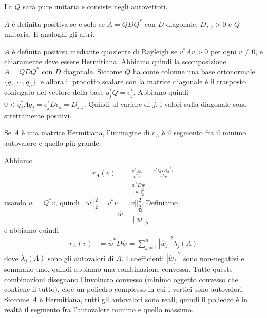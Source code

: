 \documentclass[a4paper]{article}
\begin{document}
La \(Q\) sarà pure unitaria e consiste negli autovettori.

\begin{snippettheorem}{}
    \(A\) è definita positiva se e solo se \(A = QDQ^*\) con \(D\)
    diagonale, \(D_{j,j} > 0\) e \(Q\) unitaria. E analoghi gli altri.
\end{snippettheorem}

\begin{snippetproof}{}
    \(A\) è definita positiva mediante quoziente di Rayleigh
    se \(v^* A v > 0\) per ogni \(v \neq 0\), e chiaramente deve essere Hermitiana.
    Abbiamo quindi la scomposizione \(A = QDQ^*\) con \(D\)
    diagonale.
    Siccome \(Q\) ha come colonne una base ortonormale \(\{q_1, \cdots, q_n\}\),
    e allora il prodotto scalare con la matrice diagonale
    è il trasposto coniugato del vettore della base \(q_j^* Q = e_j^t\).
    Abbiamo quindi \(0 < q_j^* A q_j = e_j^t D e_j = D_{j,j}\).
    Quindi al variare di \(j\), i valori sulla diagonale sono strettamente positivi.
\end{snippetproof}

\begin{snippettheorem}{}
    Se \(A\) è una matrice Hermitiana, l'immagine di \(r_A\)
    è il segmento fra il minimo autovalore e quello più grande.
\end{snippettheorem}

\begin{snippetproof}{}
    Abbiamo
    \begin{align*}
        r_A(v) &= \frac{v^*A v}{v^* v} = \frac{v^* Q D Q^* v}{v^* v} \\
        &= \frac{w^* D w}{||w||_2^2}
    \end{align*}
    usando \(w = Q^*v\), quindi \(||w||_2^2 = v^*v = ||v||_2^2\).
    Definiamo \[
        \hat w = \frac{w}{||w||_2}
    \]
    e abbiamo quindi
    \begin{align*}
        r_A(v) &=  \hat w^* D \hat w = \sum_{j=1}^n |\hat w_j|^2 \lambda_j(A)
    \end{align*}
    dove \(\lambda_j(A)\) sono gli autovalori di \(A\).
    I coefficienti \(|\hat w_j|^2\) sono non-negativi e sommano uno, quindi abbiamo una combinazione convessa.
    Tutte queste combinazioni disegnano l'involucro convesso (minimo oggetto convesso che contiene il tutto),
    cioè un poliedro complesso in cui i vertici
    sono autovalori.
    Siccome \(A\) è Hermitiana, tutti gli autovalori sono reali, quindi il poliedro è in realtà
    il segmento fra l'autovalore minimo e quello massimo.
\end{snippetproof}
\end{document}
